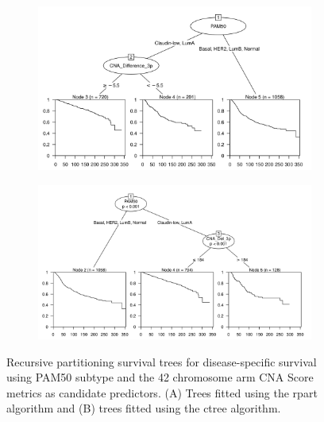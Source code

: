 \begin{figure}[!h]
\centering

\vspace{0.5cm}

\begin{subfigure}{\textwidth}
\subcaption{}
\includegraphics[width=1\textwidth]{../figures/Chapter_3/PA_PartyKit_Survival_Score_DSS_PAM50.png}
\end{subfigure}

\vspace{2cm}

\begin{subfigure}{\textwidth}
\subcaption{}
\includegraphics[width=1\textwidth]{../figures/Chapter_3/PA_Ctree_Survival_Score_DSS_PAM50.png}
\end{subfigure}

\vspace{0.5cm}

\caption[Recursive partitioning survival trees for disease-specific survival using PAM50 subtype and the 42 chromosome arm CNA Score metrics as candidate predictors.]{Recursive partitioning survival trees for disease-specific survival using PAM50 subtype and the 42 chromosome arm CNA Score metrics as candidate predictors. (A) Trees fitted using the rpart algorithm and (B) trees fitted using the ctree algorithm.}
\label{fig:PAM50_PA_CNA_Score_DSS}
\end{figure}

